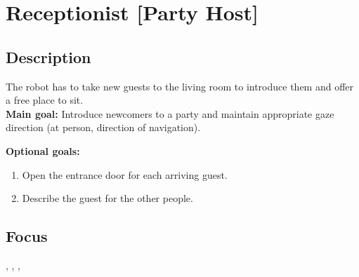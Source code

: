 \section{Receptionist [Party Host]}
\label{test:receptionist}
\subsection*{Description}
The robot has to take new guests to the living room to introduce them and offer a free place to sit.\\
    
\textbf{Main goal:}
    Introduce newcomers to a party and maintain appropriate gaze direction (at person, direction of navigation).

\textbf{Optional goals:}
\begin{enumerate}[nosep]
	\item Open the entrance door for each arriving guest.
	\item Describe the guest for the other people.
\end{enumerate}

\subsection*{Focus}
\SysI{}, \HRI{}, \PerDet{}, \PerRec

